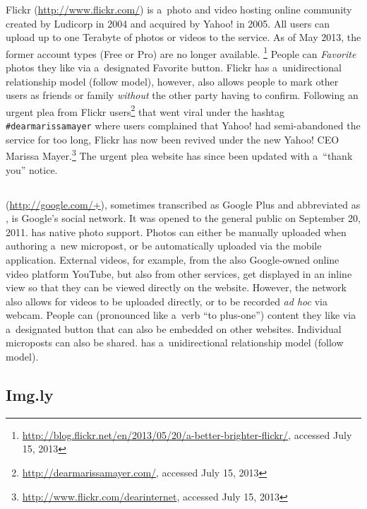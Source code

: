 Flickr (\url{http://www.flickr.com/})
is a~photo and video hosting online community
created by Ludicorp in 2004 and acquired by Yahoo! in 2005.
All users can upload up to one Terabyte of photos or videos
to the service.
As of May 2013, the former account types (Free or Pro)
are no longer available.%
\footnote{\url{http://blog.flickr.net/en/2013/05/20/a-better-brighter-flickr/},
accessed July 15, 2013}
People can \emph{Favorite} photos they like
via a~designated Favorite button.
Flickr has a~unidirectional relationship model (follow model),
however, also allows people to mark other users as friends
or family \emph{without} the other party having to confirm.
Following an urgent plea from Flickr
users\footnote{\url{http://dearmarissamayer.com/},
accessed July 15, 2013}
that went viral under the hashtag \texttt{\#dearmarissamayer}
where users complained that Yahoo!
had semi-abandoned the service for too long,
Flickr has now been revived under the new Yahoo! CEO Marissa
Mayer.\footnote{\url{http://www.flickr.com/dearinternet},
accessed July 15, 2013}
The urgent plea website has since been updated with a~``thank you'' notice.

\subsection{\googleplus}

\googleplus (\url{http://google.com/+}),
sometimes transcribed as Google Plus
and abbreviated as \gplus, is Google's social network.
It was opened to the general public on September 20, 2011.
\googleplus has native photo support.
Photos can either be manually uploaded
when authoring a~new micropost,
or be automatically uploaded via the \googleplus
mobile application.
External videos, for example, from
the also Google-owned online video platform YouTube,
but also from other services,
get displayed in an inline view
so that they can be viewed directly on the website.
However, the network also allows for
videos to be uploaded directly,
or to be recorded \emph{ad hoc} via webcam.
People can \emph{\plusone}
(pronounced like a~verb ``to plus-one'') content they like
via a~designated \plusone button
that can also be embedded on other websites.
Individual microposts can also be shared.
\googleplus has a~unidirectional relationship model
(follow model).

\subsection{Img.ly}

